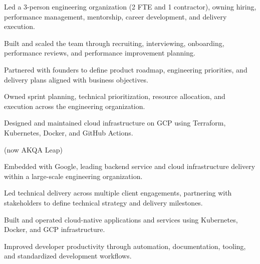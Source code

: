 \documentclass[]{plushcv}
\begin{document}
\begin{minipage}[t]{0.70\textwidth}
\begin{tightemize}
\item Led a 3-person engineering organization (2 FTE and 1 contractor), owning hiring, performance management, mentorship, career development, and delivery execution.
\item Built and scaled the team through recruiting, interviewing, onboarding, performance reviews, and performance improvement planning.
\item Partnered with founders to define product roadmap, engineering priorities, and delivery plans aligned with business objectives.
\item Owned sprint planning, technical prioritization, resource allocation, and execution across the engineering organization.
\item Designed and maintained cloud infrastructure on GCP using Terraform, Kubernetes, Docker, and GitHub Actions.
\end{tightemize}
\sectionsep

{\color{date}\fontspec[Path = \pathlocationfont]{\locationfont}\fontsize{7pt}{9pt}\selectfont\mdseries (now AKQA Leap)} 
\begin{tightemize}
\item Embedded with Google, leading backend service and cloud infrastructure delivery within a large-scale engineering organization.
\item Led technical delivery across multiple client engagements, partnering with stakeholders to define technical strategy and delivery milestones.
\item Built and operated cloud-native applications and services using Kubernetes, Docker, and GCP infrastructure.
\item Improved developer productivity through automation, documentation, tooling, and standardized development workflows.
\end{tightemize}
\sectionsep


\end{minipage}
\end{document}
